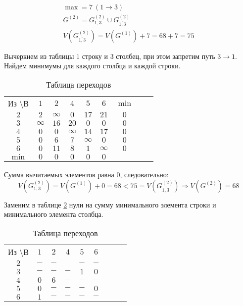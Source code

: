 \begin{gather*}
\max = 7\ (1 \rightarrow 3) \\
G^{(2)} = G_{1,3}^{(2)} \cup G_{\overline{1,3}}^{(2)} \\
V(G_{\overline{1,3}}^{(2)}) = V(G^{(1)}) + 7 = 68 + 7 = 75
\end{gather*}

Вычеркнем из таблицы $1$ строку и $3$ столбец, при этом запретим путь $3 \rightarrow 1$. Найдем минимумы для каждого столбца и каждой строки.

\begin{table}[H]
\begin{center}
	\def\tabcolsep{15pt}
	\caption{Таблица переходов}
	\label{tab:11}
	\begin{tabular}{|c||c|c|c|c|c|c|c|c|}
		\hline
		Из \textbackslash В & $1$ & $2$ & $4$ & $5$ & $6$ & $\min$ \\
		\hhline{|=#=|=|=|=|=|=|}
		\hline
		$2$ & $2$ & $\infty$ & $0$ & $17$ & $21$ & $0$ \\
		\hline
		$3$ & $\infty$ & $16$ & $20$ & $0$ & $0$ & $0$  \\ 
		\hline
		$4$ & $0$ & $0$ & $\infty$ & $14$ & $17$ & $0$  \\
		\hline
		$5$ & $0$ & $6$ & $7$ & $\infty$ & $0$ & $0$  \\
		\hline
		$6$ & $0$ & $11$ & $8$ & $1$ & $\infty$ & $0$  \\ 
		\hhline{|=#=|=|=|=|=|=|}
		$\min$ & $0$ & $0$ & $0$ & $0$ & $0$ & \\
		\hline 
	\end{tabular}
\end{center}
\end{table}

Сумма вычитаемых элементов равна $0$, следовательно:
\begin{equation*}
V(G_{1,3}^{(2)}) = V(G^{(1)}) + 0 = 68 < 75 = V(G_{\overline{1,3}}^{(2)}) \Rightarrow V(G^{(2)}) = 68
\end{equation*}

Заменим в таблице \ref{tab:11} нули на сумму минимального элемента строки и минимального элемента столбца.

\begin{table}[H]
\begin{center}
	\def\tabcolsep{15pt}
	\caption{Таблица переходов}
	\label{tab:11}
	\begin{tabular}{|c||c|c|c|c|c|c|c|c|}
		\hline
		Из \textbackslash В & $1$ & $2$ & $4$ & $5$ & $6$ \\
		\hhline{|=#=|=|=|=|=|=|}
		\hline
		$2$ & $-$ & $-$ & \redbold{$9$} & $-$ & $-$ \\
		\hline
		$3$ & $-$ & $-$ & $-$ & $1$ & $0$ \\ 
		\hline
		$4$ & $0$ & $6$ & $-$ & $-$ & $-$ \\
		\hline
		$5$ & $0$ & $-$ & $-$ & $-$ & $0$ \\
		\hline
		$6$ & $1$ & $-$ & $-$ & $-$ & $-$ \\
		\hline 
	\end{tabular}
\end{center}
\end{table}

